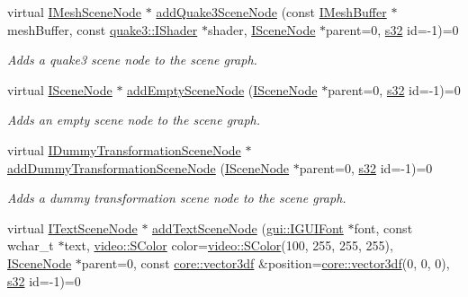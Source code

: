 \begin{DoxyCompactItemize}
virtual \hyperlink{classirr_1_1scene_1_1IMeshSceneNode}{I\+Mesh\+Scene\+Node} $\ast$ \hyperlink{classirr_1_1scene_1_1ISceneManager_a58642d304110532988d27cebbe76ed41}{add\+Quake3\+Scene\+Node} (const \hyperlink{classirr_1_1scene_1_1IMeshBuffer}{I\+Mesh\+Buffer} $\ast$mesh\+Buffer, const \hyperlink{structirr_1_1scene_1_1quake3_1_1IShader}{quake3\+::\+I\+Shader} $\ast$shader, \hyperlink{classirr_1_1scene_1_1ISceneNode}{I\+Scene\+Node} $\ast$parent=0, \hyperlink{namespaceirr_ac66849b7a6ed16e30ebede579f9b47c6}{s32} id=-\/1)=0
\begin{DoxyCompactList}\small\item\em Adds a quake3 scene node to the scene graph. \end{DoxyCompactList}\item 
virtual \hyperlink{classirr_1_1scene_1_1ISceneNode}{I\+Scene\+Node} $\ast$ \hyperlink{classirr_1_1scene_1_1ISceneManager_a3811d3d2a092474e2c5613d550678187}{add\+Empty\+Scene\+Node} (\hyperlink{classirr_1_1scene_1_1ISceneNode}{I\+Scene\+Node} $\ast$parent=0, \hyperlink{namespaceirr_ac66849b7a6ed16e30ebede579f9b47c6}{s32} id=-\/1)=0
\begin{DoxyCompactList}\small\item\em Adds an empty scene node to the scene graph. \end{DoxyCompactList}\item 
virtual \hyperlink{classirr_1_1scene_1_1IDummyTransformationSceneNode}{I\+Dummy\+Transformation\+Scene\+Node} $\ast$ \hyperlink{classirr_1_1scene_1_1ISceneManager_ad7aa119894aa960f428b7baefcedc58a}{add\+Dummy\+Transformation\+Scene\+Node} (\hyperlink{classirr_1_1scene_1_1ISceneNode}{I\+Scene\+Node} $\ast$parent=0, \hyperlink{namespaceirr_ac66849b7a6ed16e30ebede579f9b47c6}{s32} id=-\/1)=0
\begin{DoxyCompactList}\small\item\em Adds a dummy transformation scene node to the scene graph. \end{DoxyCompactList}\item 
\mbox{\label{classirr_1_1scene_1_1ISceneManager_ae3a173f0b0dd97e69251a22b5e4fbc0f}} 
virtual \hyperlink{classirr_1_1scene_1_1ITextSceneNode}{I\+Text\+Scene\+Node} $\ast$ \hyperlink{classirr_1_1scene_1_1ISceneManager_ae3a173f0b0dd97e69251a22b5e4fbc0f}{add\+Text\+Scene\+Node} (\hyperlink{classirr_1_1gui_1_1IGUIFont}{gui\+::\+I\+G\+U\+I\+Font} $\ast$font, const wchar\+\_\+t $\ast$text, \hyperlink{classirr_1_1video_1_1SColor}{video\+::\+S\+Color} color=\hyperlink{classirr_1_1video_1_1SColor}{video\+::\+S\+Color}(100, 255, 255, 255), \hyperlink{classirr_1_1scene_1_1ISceneNode}{I\+Scene\+Node} $\ast$parent=0, const \hyperlink{namespaceirr_1_1core_ae6e2b2a6c552833ebbd5b7463d03586b}{core\+::vector3df} \&position=\hyperlink{namespaceirr_1_1core_ae6e2b2a6c552833ebbd5b7463d03586b}{core\+::vector3df}(0, 0, 0), \hyperlink{namespaceirr_ac66849b7a6ed16e30ebede579f9b47c6}{s32} id=-\/1)=0

\end{DoxyCompactItemize}
